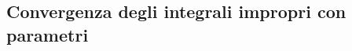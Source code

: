 \subsection{Convergenza degli integrali impropri con parametri}
\label{sec:esercizi-integrali-integrali-impropri-con-parametri}
